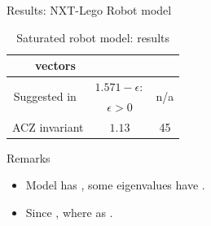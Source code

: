 \begin{frame}{Results: NXT-Lego Robot model}
{\begin{minipage}{0.48\textwidth}
\begin{table}
{\begin{tabular}{|l|c|c|c|}
& vectors & & \\
\hline
\multicolumn{2}{|c|}{\multirow{2}{*}{Suggested in~\cite{heinz2014benchmark}}} &
$1.571-\epsilon:$ & \multirow{2}{*}{n/a}\\
\multicolumn{2}{|c|}{} & $\epsilon>0$ &\\
\hline
\multicolumn{2}{|c|}{\multirow{2}{*}{ACZ invariant}} & \multirow{2}{*}{$1.13$} &
\multirow{2}{*}{45}\\
\multicolumn{2}{|c|}{} & &\\
\hline
\end{tabular}
}
\caption*{{\footnotesize Saturated robot model: results}}
\end{table}
\end{minipage}
}
\vspace{-2em}
\begin{alertblock}{Remarks}
\begin{itemize}
\item Model has , some eigenvalues have .
\item Since , where as  .
\end{itemize}
\end{alertblock}
\end{frame}

